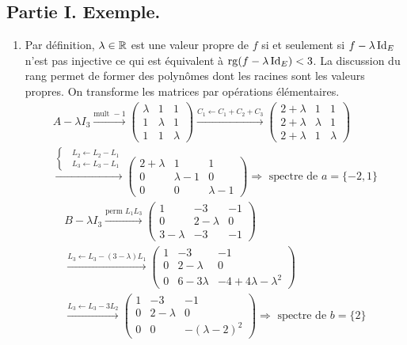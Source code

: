 \subsection*{Partie I. Exemple.}
\begin{enumerate}
\item Par définition, $\lambda\in \mathbb{R}$ est une valeur propre de $f$ si et seulement si $f-\lambda\operatorname{Id}_E$ n'est pas injective ce qui est équivalent à $\operatorname{rg}(f-\lambda \operatorname{Id}_E)<3$. La discussion du rang permet de former des polynômes dont les racines sont les valeurs propres. On transforme les matrices par opérations élémentaires.
\begin{multline*}
A-\lambda I_3 \xrightarrow{\text{mult } -1}
\begin{pmatrix}
 \lambda & 1 & 1 \\ 1 & \lambda & 1 \\ 1 & 1 & \lambda
\end{pmatrix}
\xrightarrow{C_1 \leftarrow C_1+C_2+C_3}
\begin{pmatrix}
2 + \lambda & 1 & 1 \\ 2 + \lambda & \lambda & 1 \\ 2 + \lambda & 1 & \lambda
\end{pmatrix}\\
\xrightarrow{
\left\lbrace 
\begin{aligned}
 &L_2 \leftarrow L_2 - L_1 \\  &L_3 \leftarrow L_3 - L_1 
\end{aligned}
\right. 
}
\begin{pmatrix}
2 + \lambda & 1 & 1 \\ 0 & \lambda -1 & 0 \\ 0 & 0 & \lambda -1
\end{pmatrix}
\Rightarrow \text{ spectre de }a = \{-2, 1\}
\end{multline*}
\begin{multline*}
B-\lambda I_3 \xrightarrow{\text{perm }L_1 L_3 }
\begin{pmatrix}
1 & -3 & -1 \\ 0 & 2-\lambda &0 \\ 3-\lambda & -3 & -1 
\end{pmatrix}\\
\xrightarrow{L_3\leftarrow L_3 -(3-\lambda) L_1} 
\begin{pmatrix}
1 & -3 & -1 \\ 0 & 2-\lambda &0 \\ 0 & 6-3\lambda & -4+4\lambda - \lambda^2 
\end{pmatrix} \\
\xrightarrow{L_3\leftarrow L_3 -3 L_2} 
\begin{pmatrix}
1 & -3 & -1 \\ 0 & 2-\lambda &0 \\ 0 & 0 & -(\lambda-2)^2 
\end{pmatrix}
\Rightarrow \text{ spectre de }b = \{2\}
\end{multline*}


\end{enumerate}
